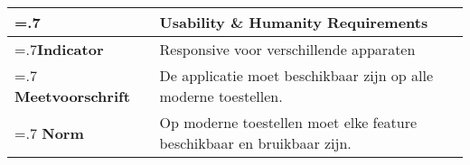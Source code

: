 \noindent
\begin{longtable}{|>{\raggedleft\hsize=.7\hsize\bfseries}X|
    >{\arraybackslash\hsize=1.3\hsize}X|} \hline
\multicolumn{1}{|l|}{\textbf{NFR}} & Usability \& Humanity Requirements\\ \hline
Indicator & Responsive voor verschillende apparaten 
 \\  \hline
Meetvoorschrift & De applicatie moet beschikbaar zijn op alle moderne toestellen.\\ \hline
Norm & Op moderne toestellen moet elke feature beschikbaar en bruikbaar zijn.\\ \hline
\end{longtable}